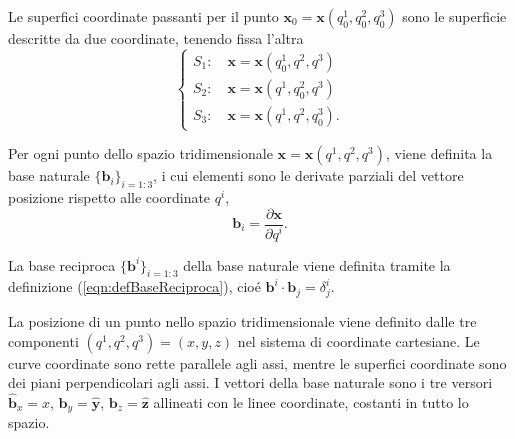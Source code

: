 \begin{definition}
 Le superfici coordinate passanti per il punto $\bm{x}_0=\bm{x}(q_0^1,q_0^2,q_0^3)$ sono le superficie descritte da due coordinate, tenendo fissa l'altra
 \begin{equation}
 \begin{cases}
  S_1 : \quad \bm{x} = \bm{x}(q_0^1, q^2, q^3) \\
  S_2 : \quad \bm{x} = \bm{x}(q^1, q_0^2, q^3) \\
  S_3 : \quad \bm{x} = \bm{x}(q^1, q^2, q_0^3) .
 \end{cases}
 \end{equation}
\end{definition}
 
\begin{definition}
 Per ogni punto dello spazio tridimensionale $\bm{x}=\bm{x}(q^1,q^2,q^3)$, viene definita la base naturale $\{ \bm{b}_i \}_{i=1:3}$, i cui elementi sono le derivate parziali del vettore posizione rispetto alle coordinate $q^i$,
 \begin{equation}
  \bm{b}_i = \dfrac{\partial \bm{x}}{\partial q^i} . %
 \end{equation}
\end{definition}
  La base reciproca $\{ \bm{b}^i \}_{i=1:3}$ della base naturale viene definita tramite la definizione (\ref{eqn:defBaseReciproca}), cioé $\bm{b}^i \cdot \bm{b}_j = \delta_j^i$.

\begin{example}
 La posizione di un punto nello spazio tridimensionale viene definito dalle tre componenti $(q^1, q^2, q^3)=(x,y,z)$ nel sistema di coordinate cartesiane. Le curve coordinate sono rette parallele agli assi, mentre le superfici coordinate sono dei piani perpendicolari agli assi. I vettori della base naturale sono i tre versori $\bm{\hat{b}}_x = {\hat{x}}$, $\bm{b}_y = \bm{\hat{y}}$, $\bm{b}_z = \bm{\hat{z}}$ allineati con le linee coordinate, costanti in tutto lo spazio.
\end{example}

